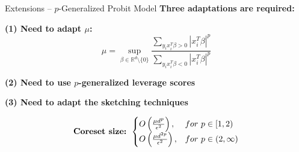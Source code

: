 \documentclass[gray]{beamer}
\begin{document}
\begin{frame}{Extensions -- $p$-Generalized Probit Model}
    \textbf{Three adaptations are required:}

    \vspace{\fill}

    \textbf{(1) Need to adapt $\mu$:}
    \begin{equation*}
        \mu = \sup_{\beta \in \mathbb{R}^d \setminus \{0\} }
        \frac{\sum_{y_ix_i^T\beta > 0} |x_i^T \beta|^p}
        {\sum_{y_ix_i^T\beta < 0}|x_i^T \beta|^p}
    \end{equation*}

    \pause

    \vspace{\fill}

    \textbf{(2) Need to use $p$-generalized leverage scores}

    \pause

    \vspace{\fill}

    \textbf{(3) Need to adapt the sketching techniques}

    \pause

    \vspace{\fill}

    \begin{equation*}
        \text{\textbf{Coreset size:} } \begin{cases}
            O\left(\frac{\mu d^p}{\epsilon^2}\right),    & for\ p \in [1, 2)      \\
            O\left(\frac{\mu d^{2p}}{\epsilon^2}\right), & for\ p \in (2, \infty)
        \end{cases}
    \end{equation*}
\end{frame}
\end{document}
